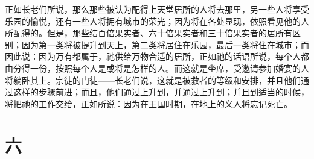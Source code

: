 正如长老们所说，那么那些被认为配得上天堂居所的人将去那里，另一些人将享受乐园的愉悦，还有一些人将拥有城市的荣光；因为将在各处显现，依照看见他的人所配得的。但是，那些结百倍果实者、六十倍果实者和三十倍果实者的居所有区别；因为第一类将被提升到天上，第二类将居住在乐园，最后一类将住在城市；而因此说：因为万有都属于，祂供给万物合适的居所，正如祂的话语所说，每个人都由分得一份，按照每个人是或将是怎样的人。而这就是坐席，受邀请参加婚宴的人将躺卧其上。宗徒的门徒——长老们说，这就是被救者的等级和安排，并且他们通过这样的步骤前进；而且，他们通过上升到，并通过上升到；并且到适当的时候，将把祂的工作交给，正如所说：因为在王国时期，在地上的义人将忘记死亡。\par


\section{六}

